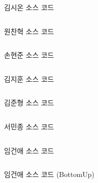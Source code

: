 \begin{frame}{김시온 소스 코드}
\inputminted{java}{../src/\prob/sion/Main.java}
\end{frame}

\begin{frame}{원찬혁 소스 코드}
\inputminted{java}{../src/\prob/chanhyeok/Main.java}
\end{frame}

\begin{frame}{손현준 소스 코드}
\inputminted{java}{../src/\prob/hyunjoon/P22971.java}
\end{frame}

\begin{frame}{김지훈 소스 코드}
\inputminted{java}{../src/\prob/jihoon/Main.java}
\end{frame}

\begin{frame}{김준형 소스 코드}
\inputminted{java}{../src/\prob/joonhyeong/Main.java}
\end{frame}

\begin{frame}{서민종 소스 코드}
\inputminted{java}{../src/\prob/minjong/Main.java}
\end{frame}

\begin{frame}{임건애 소스 코드}
\inputminted{java}{../src/\prob/geonae/b22971.java}
\end{frame}

\begin{frame}{임건애 소스 코드 (BottomUp)}
\inputminted{java}{../src/\prob/geonae/b22971_bottom.java}
\end{frame}
